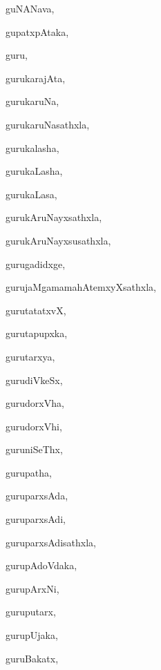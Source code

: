 \begin{multicols}{3}
{\noindent
{guNANava}, \pageref{guNANava}

\noindent
{gupatxpAtaka}, \pageref{gupatxpAtaka}

\noindent
{guru}, \pageref{guru}

\noindent
{gurukarajAta}, \pageref{gurukarajAta}

\noindent
{gurukaruNa}, \pageref{gurukaruNa}

\noindent
{gurukaruNasathxla}, \pageref{gurukaruNasathxla}

\noindent
{gurukalasha}, \pageref{gurukalasha}

\noindent
{gurukaLasha}, \pageref{gurukaLasha}

\noindent
{gurukaLasa}, \pageref{gurukaLasa}

\noindent
{gurukAruNayxsathxla}, \pageref{gurukAruNayxsathxla}

\noindent
{gurukAruNayxsusathxla}, \pageref{gurukAruNayxsusathxla}

\noindent
{gurugadidxge}, \pageref{gurugadidxge}

\noindent
{gurujaMgamamahAtemxyXsathxla}, \pageref{gurujaMgamamahAtemxyXsathxla}

\noindent
{gurutatatxvX}, \pageref{gurutatatxvX}

\noindent
{gurutapupxka}, \pageref{gurutapupxka}

\noindent
{gurutarxya}, \pageref{gurutarxya}

\noindent
{gurudiVkeSx}, \pageref{gurudiVkeSx}

\noindent
{gurudorxVha}, \pageref{gurudorxVha}

\noindent
{gurudorxVhi}, \pageref{gurudorxVhi}

\noindent
{guruniSeThx}, \pageref{guruniSeThx}

\noindent
{gurupatha}, \pageref{gurupatha}

\noindent
{guruparxsAda}, \pageref{guruparxsAda}

\noindent
{guruparxsAdi}, \pageref{guruparxsAdi}

\noindent
{guruparxsAdisathxla}, \pageref{guruparxsAdisathxla}

\noindent
{gurupAdoVdaka}, \pageref{gurupAdoVdaka}

\noindent
{gurupArxNi}, \pageref{gurupArxNi}

\noindent
{guruputarx}, \pageref{guruputarx}

\noindent
{gurupUjaka}, \pageref{gurupUjaka}

\noindent
{guruBakatx}, \pageref{guruBakatx}

}
\end{multicols}
